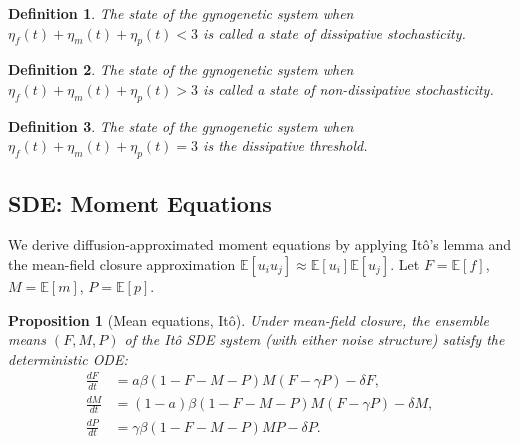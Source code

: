 \documentclass[12pt]{article}
\newtheorem{proposition}{Proposition}
\newtheorem{definition}{Definition}
\begin{document}
\begin{definition}
The state of the gynogenetic system when $\eta_f(t)+\eta_m(t)+\eta_p(t)<3$ is called a \textit{state of dissipative stochasticity}.
\end{definition}

\begin{definition}
The state of the gynogenetic system when $\eta_f(t)+\eta_m(t)+\eta_p(t)>3$ is called a \textit{state of non-dissipative stochasticity}.
\end{definition}

\begin{definition}
The state of the gynogenetic system when $\eta_f(t)+\eta_m(t)+\eta_p(t)=3$ is the \textit{dissipative threshold}.
\end{definition}


\subsection{SDE: Moment Equations}

We derive diffusion-approximated moment equations by applying It\^{o}'s lemma and the mean-field closure approximation $\mathbb{E}[u_i u_j] \approx \mathbb{E}[u_i]\mathbb{E}[u_j]$.  Let $F = \mathbb{E}[f]$, $M = \mathbb{E}[m]$, $P = \mathbb{E}[p]$.

\begin{proposition}[Mean equations, It\^{o}]\label{prop:ito_means}
Under mean-field closure, the ensemble means $(F, M, P)$ of the It\^{o} SDE system (with either noise structure) satisfy the deterministic ODE:
\begin{align}
  \frac{dF}{dt} &= a\beta(1-F-M-P)M(F - \gamma P) - \delta F, \\
  \frac{dM}{dt} &= (1-a)\beta(1-F-M-P)M(F - \gamma P) - \delta M, \\
  \frac{dP}{dt} &= \gamma\beta(1-F-M-P)MP - \delta P.
\end{align}
\end{proposition}
\end{document}
